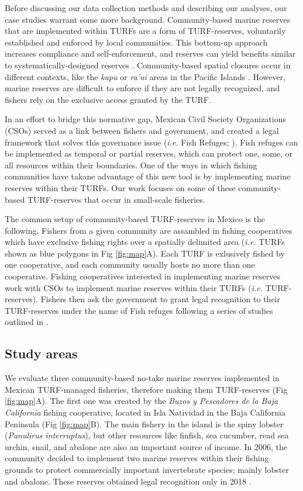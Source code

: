\documentclass{frontiersSCNS}
\begin{document}
Before discussing our data collection methods and describing our
analyses, our case studies warrant some more background. Community-based
marine reserves that are implemented within TURFs are a form of
TURF-reserves, voluntarily established and enforced by local
communities. This bottom-up approach increases compliance and
self-enforcement, and reserves can yield benefits similar to
systematically-designed reserves
\citep{beger_2004,gelcich_2015,smallhornwest_2018}. Community-based
spatial closures occur in different contexts, like the \emph{kapu} or
\emph{ra'ui} areas in the Pacific Islands
\citep{bohnsack_2004,johannes_2002}. However, marine reserves are
difficult to enforce if they are not legally recognized, and fishers
rely on the exclusive access granted by the TURF.

In an effort to bridge this normative gap, Mexican Civil Society
Organizations (CSOs) served as a link between fishers and government,
and created a legal framework that solves this governance issue
(\emph{i.e.} Fish Refuges; \citet{nom}). Fish refuges can be implemented
as temporal or partial reserves, which can protect one, some, or all
resources within their boundaries. One of the ways in which fishing
communities have takane advantage of this new tool is by implementing
marine reserves within their TURFs. Our work focuses on some of these
community-based TURF-reserves that occur in small-scale fisheries.

The common setup of community-based TURF-reserves in Mexico is the
following. Fishers from a given community are assambled in fishing
cooperatives which have exclusive fishing rights over a spatially
delimited area (\emph{i.e.} TURFs shown as blue polygons in Fig
\ref{fig:map}A). Each TURF is exlusively fished by one cooperative, and
each community usually hosts no more than one cooperative. Fishing
cooperatives interested in implementing marine reserves work with CSOs
to implement marine reserves within their TURFs (\emph{i.e.}
TURF-reserves). Fishers then ask the government to grant legal
recognition to their TURF-reserves under the name of Fish refuges
following a series of studies outlined in \citet{nom}.

\hypertarget{study-areas}{%
\subsection{Study areas}\label{study-areas}}

We evaluate three community-based no-take marine reserves implemented in
Mexican TURF-managed fisheries, therefore making them TURF-reserves (Fig
\ref{fig:map}A). The first one was created by the \emph{Buzos y
Pescadores de la Baja California} fishing cooperative, located in Isla
Natividad in the Baja California Peninsula (Fig \ref{fig:map}B). The
main fishery in the island is the spiny lobster (\emph{Panulirus
interruptus}), but other resources like finfish, sea cucumber, read sea
urchin, snail, and abalone are also an important source of income. In
2006, the community decided to implement two marine reserves within
their fishing grounds to protect commercially important invertebrate
species; mainly lobster and abalone. These reserves obtained legal
recognition only in 2018 \citep{dof_website_2018}.
\end{document}
